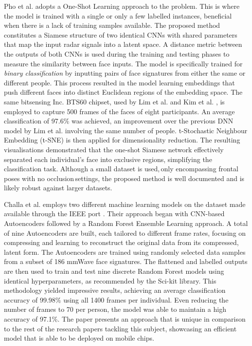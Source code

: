 \documentclass{interim}
\begin{document}
Pho et al. \cite{pho2021radar} adopts a One-Shot Learning approach to the problem. This is where the model is trained with a single or only a few labelled instances, beneficial when there is a lack of training samples available. The proposed method constitutes a Siamese structure of two identical CNNs with shared parameters that map the input radar signals into a latent space. A distance metric between the outputs of both CNNs is used during the training and testing phases to measure the similarity between face inputs. The model is specifically trained for \textit{binary classification} by inputting pairs of face signatures from either the same or different people. This process resulted in the model learning embeddings that push different faces into distinct Euclidean regions of the embedding space. The same bitsensing Inc. BTS60 chipset, used by Lim et al. and Kim et al. \cite{lim2020dnn, kim2020face}, is employed to capture 500 frames of the faces of eight participants. An average classification of 97.6\% was achieved, an improvement over the previous DNN model by Lim et al. involving the same number of people. t-Stochastic Neighbour Embedding (t-SNE) \cite{van2008visualizing} is then applied for dimensionality reduction. The resulting visualisations demonstrated that the one-shot Siamese network effectively separated each individual's face into exclusive regions, simplifying the classification task. Although a small dataset is used,\,only encompassing frontal poses with no occlusion\,settings, the proposed method is well documented and is likely robust against larger datasets.

Challa et al. \cite{challa2021face} employs two different machine learning models on the dataset made available through the IEEE port \cite{mmwavefacedata}. Their approach began with CNN-based Autoencoders followed by a Random Forest Ensemble Learning approach. A total of nine Autoencoders are built, each tailored to different frame rates, focusing on compressing and learning to reconstruct the original data from its compressed, latent form. The Autoencoders are trained using randomly selected data samples from a subset of 186 mmWave face signatures. The flattened and labelled outputs are then used to train and test nine discrete Random Forest models using identical hyperparameters, as recommended by the Sci-kit library. This methodology yielded impressive results, achieving an average classification accuracy of 99.98\% using all 1400 frames per individual. Even reducing the number of frames to 70 per person, the model was able to maintain a high accuracy of 97.1\%. The paper presents an approach that is unique in comparison to the rest of the research papers tackling this subject, showcasing an efficient model that is able to be deployed on mobile chips.
\end{document}
